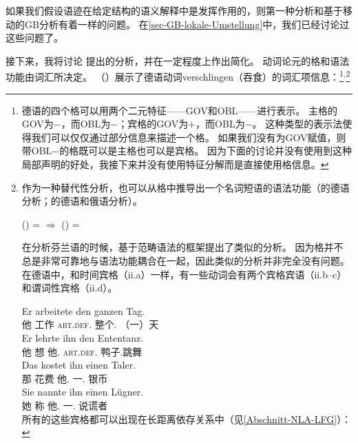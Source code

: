 \noindent
如果我们假设语迹在给定结构的语义解释中是发挥作用的，则第一种分析和基于移动的GB分析有着一样的问题。
在\ref{sec-GB-lokale-Umstellung}中，我们已经讨论过这些问题了。

接下来，我将讨论 \citet[\S~2.1.3]{Berman96a-u}提出的分析，并在一定程度上作出简化。
动词论元的格和语法功能由词汇所决定\citep[]{Berman96a-u}。
（）展示了德语动词verschlingen（吞食）的词汇项信息：\footnote{%
  德语的四个格可以用两个二元特征——{\small GOV}和{\small OBL}——进行表示\citep[]{Berman96a-u}。
  主格的{\small GOV}为$-$，而{\small OBL}为$-$；宾格的{\small GOV}为$+$，而{\small OBL}为$-$。
  这种类型的表示法使得我们可以仅仅通过部分信息来描述一个格。
  如果我们没有为{\small GOV}赋值，则带{\small OBL}$-$的格既可以是主格也可以是宾格。
  因为下面的讨论并没有使用到这种局部声明的好处，我接下来并没有使用特征分解而是直接使用格信息。
}$^,$\footnote{%
  作为一种替代性分析，也可以从格中推导出一个名词短语的语法功能（\citet[]{Berman2003a}的德语分析；\citet[, ]{Bresnan2001a}的德语和俄语分析）。

\ea
\label{Kasus-Implikation-Berman}
\upshape      (\downsp \case) = \mdacc{} $\Rightarrow$ (\upsp \lfgobj) = \down{}
\z

\noindent
   \citet[\S~2.1]{Karttunen89a-u}在分析芬兰语的时候，基于范畴语法\indexcxgc 的框架提出了类似的分析。
  因为格并不总是非常可靠地与语法功能耦合在一起，因此类似的分析并非完全没有问题。
  在德语中，和时间宾格（ii.a）一样，有一些动词会有两个宾格宾语（ii.b--c）和谓词性宾格（ii.d）。

\eal
\ex 
\gll Er arbeitete den ganzen Tag.\\
     他 工作 \textsc{art}.\textsc{def}.\acc{} 整个.\acc{} （一）天\\
\ex 
\gll Er lehrte ihn den Ententanz.\\
     他 想 他.\acc{} \textsc{art}.\textsc{def}.\acc{} 鸭子.跳舞\\
\ex 
\gll Das kostet ihn einen Taler.\\
     那 花费 他.\acc{} 一.\acc{} 银币\\
\ex 
\gll Sie nannte ihn einen Lügner.\\
     她 称 他.\acc{} 一.\acc{} 说谎者\\
\zl
所有的这些宾格都可以出现在长距离依存关系中（见\ref{Abschnitt-NLA-LFG}）：

}
